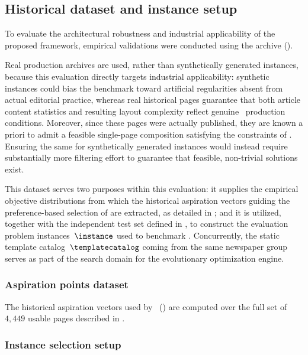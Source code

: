 \subsection{Historical dataset and instance setup}
\label{subsec:dataset_characterization}

To evaluate the architectural robustness and industrial applicability of the proposed framework, empirical validations were conducted using the \laprovence archive (). 

Real production archives are used, rather than synthetically generated instances, because this evaluation directly targets industrial applicability: synthetic instances could bias the benchmark toward artificial regularities absent from actual editorial practice, whereas real historical pages guarantee that both article content statistics and resulting layout complexity reflect genuine \melody\ production conditions. 
Moreover, since these pages were actually published, they are known a priori to admit a feasible single-page composition satisfying the constraints of . Ensuring the same for synthetically generated instances would instead require substantially more filtering effort to guarantee that feasible, non-trivial solutions exist.

This dataset serves two purposes within this evaluation: it supplies the empirical objective distributions from which the historical aspiration vectors guiding the preference-based selection of \methodName are extracted, as detailed in ; and it is utilized, together with the independent test set defined in , to construct the evaluation problem instances~$\instance$ used to benchmark \methodName. Concurrently, the static template catalog~$\templatecatalog$ coming from the same newspaper group serves as part of the search domain for the evolutionary optimization engine.

\subsubsection{Aspiration points dataset}

The historical aspiration vectors used by \methodName\ () are computed over the full set of $4{,}449$ usable \laprovence pages described in .

\subsubsection{Instance selection setup}


